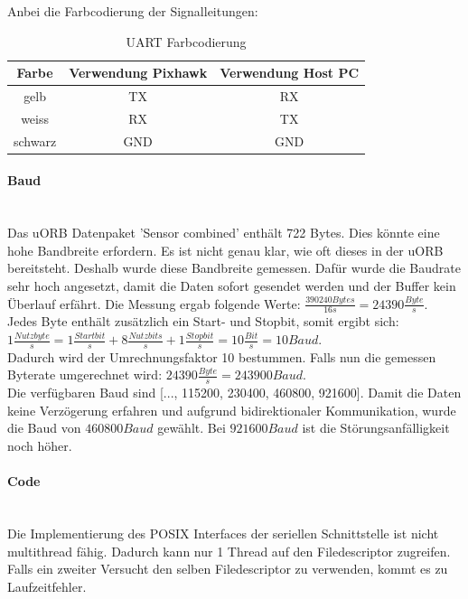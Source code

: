 \noindent Anbei die Farbcodierung der Signalleitungen:
\begin{table}[ht]
\begin{center}
  \begin{tabular}{| c | c | c |}
    \hline
    Farbe & Verwendung Pixhawk & Verwendung Host PC \\
    \hline
    gelb  & TX & RX \\
    \hline
    weiss & RX & TX \\
    \hline
    schwarz & GND & GND \\
    \hline
  \end{tabular}
  
  \caption{UART Farbcodierung}
  \label{tab:UART color}
  
\end{center}
\end{table}

\paragraph{Baud}\mbox{}\\
\noindent Das uORB Datenpaket 'Sensor combined' enthält 722 Bytes. Dies könnte eine hohe Bandbreite erfordern. Es ist nicht genau klar, wie oft dieses in der uORB bereitsteht. Deshalb wurde diese Bandbreite gemessen. Dafür wurde die Baudrate sehr hoch angesetzt, damit die Daten sofort gesendet werden und der Buffer kein Überlauf erfährt. Die Messung ergab folgende Werte:
\noindent $\frac{390240 Bytes}{16 s} = 24390 \frac{Byte}{s}$.\\
Jedes Byte enthält zusätzlich ein Start- und Stopbit, somit ergibt sich: \\
$1 \frac{Nutzbyte}{s} = 1 \frac{Startbit}{s} +8 \frac{Nutzbits}{s} +1 \frac{Stopbit}{s} =10 \frac{Bit}{s} = 10 Baud$.\\
Dadurch wird der Umrechnungsfaktor 10 bestummen. Falls nun die gemessen Byterate umgerechnet wird:  $24390 \frac{Byte}{s} = 243900 Baud$.\\

\noindent Die verfügbaren Baud sind [..., 115200, 230400, 460800, 921600]. Damit die Daten keine Verzögerung erfahren und aufgrund bidirektionaler Kommunikation, wurde die Baud von $460800Baud$ gewählt. Bei $921600Baud$ ist die Störungsanfälligkeit noch höher.


\paragraph{Code}\mbox{}\\
Die Implementierung des POSIX Interfaces der seriellen Schnittstelle ist nicht multithread fähig. Dadurch kann nur 1 Thread auf den Filedescriptor zugreifen. Falls ein zweiter Versucht den selben Filedescriptor zu verwenden, kommt es zu Laufzeitfehler.\\

